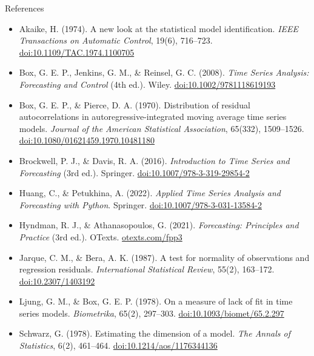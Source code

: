 \begin{frame}{References}
\itemsize{\tiny}
\begin{itemize}
    \item Akaike, H. (1974). A new look at the statistical model identification. \textit{IEEE Transactions on Automatic Control}, 19(6), 716--723. \href{https://doi.org/10.1109/TAC.1974.1100705}{doi:10.1109/TAC.1974.1100705}
    \item Box, G. E. P., Jenkins, G. M., \& Reinsel, G. C. (2008). \textit{Time Series Analysis: Forecasting and Control} (4th ed.). Wiley. \href{https://doi.org/10.1002/9781118619193}{doi:10.1002/9781118619193}
    \item Box, G. E. P., \& Pierce, D. A. (1970). Distribution of residual autocorrelations in autoregressive-integrated moving average time series models. \textit{Journal of the American Statistical Association}, 65(332), 1509--1526. \href{https://doi.org/10.1080/01621459.1970.10481180}{doi:10.1080/01621459.1970.10481180}
    \item Brockwell, P. J., \& Davis, R. A. (2016). \textit{Introduction to Time Series and Forecasting} (3rd ed.). Springer. \href{https://doi.org/10.1007/978-3-319-29854-2}{doi:10.1007/978-3-319-29854-2}
    \item Huang, C., \& Petukhina, A. (2022). \textit{Applied Time Series Analysis and Forecasting with Python}. Springer. \href{https://doi.org/10.1007/978-3-031-13584-2}{doi:10.1007/978-3-031-13584-2}
    \item Hyndman, R. J., \& Athanasopoulos, G. (2021). \textit{Forecasting: Principles and Practice} (3rd ed.). OTexts. \href{https://otexts.com/fpp3/}{otexts.com/fpp3}
    \item Jarque, C. M., \& Bera, A. K. (1987). A test for normality of observations and regression residuals. \textit{International Statistical Review}, 55(2), 163--172. \href{https://doi.org/10.2307/1403192}{doi:10.2307/1403192}
    \item Ljung, G. M., \& Box, G. E. P. (1978). On a measure of lack of fit in time series models. \textit{Biometrika}, 65(2), 297--303. \href{https://doi.org/10.1093/biomet/65.2.297}{doi:10.1093/biomet/65.2.297}
    \item Schwarz, G. (1978). Estimating the dimension of a model. \textit{The Annals of Statistics}, 6(2), 461--464. \href{https://doi.org/10.1214/aos/1176344136}{doi:10.1214/aos/1176344136}
\end{itemize}
\end{frame}



